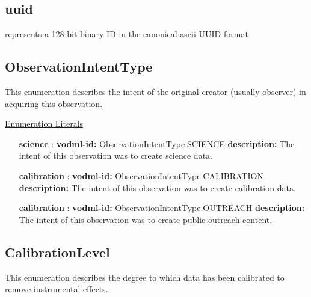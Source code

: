   \subsection{uuid}
  \label{sect:uuid}
  represents a 128-bit binary ID in the canonical ascii UUID format

  \subsection{ObservationIntentType}
  \label{sect:ObservationIntentType}

  This enumeration describes the intent of the original creator (usually observer) in acquiring this observation.

  \noindent \underline{Enumeration Literals}
  \vspace{-\parsep}
  \small
  \begin{itemize}
  
    \item[\textbf{science}]: \textbf{vodml-id:} ObservationIntentType.SCIENCE \newline
          \textbf{description:} The intent of this observation was to create science data.
    \item[\textbf{calibration}]: \textbf{vodml-id:} ObservationIntentType.CALIBRATION \newline
          \textbf{description:} The intent of this observation was to create calibration data.
    \item[\textbf{calibration}]: \textbf{vodml-id:} ObservationIntentType.OUTREACH \newline
          \textbf{description:} The intent of this observation was to create public outreach content.
  \end{itemize}
  \normalsize


  \subsection{CalibrationLevel}
  \label{sect:CalibrationLevel}

  This enumeration describes the degree to which data has been calibrated to remove instrumental effects. 

